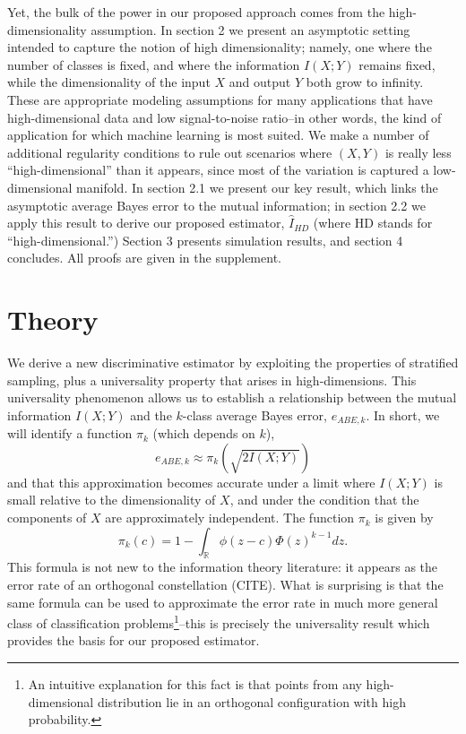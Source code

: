 \documentclass{article}
\begin{document}
Yet, the bulk of the power in our proposed approach comes from the high-dimensionality assumption.
In section 2 we present an asymptotic
setting intended to capture the notion of high dimensionality; namely,
one where the number of classes is fixed, and where the information
$I(X; Y)$ remains fixed, while the dimensionality of the input $X$ and
output $Y$ both grow to infinity.  
These are appropriate modeling assumptions for many applications
that have high-dimensional data and low signal-to-noise ratio--in other words, the kind of application
for which machine learning is most suited.
We make a number of additional
regularity conditions to rule out scenarios where $(X, Y)$ is really
less ``high-dimensional'' than it appears, since most of the variation
is captured a low-dimensional manifold.  In section 2.1 we present our
key result, which links the asymptotic average Bayes error to the
mutual information; in section 2.2 we apply this result to derive our
proposed estimator, $\hat{I}_{HD}$ (where HD stands for ``high-dimensional.'')  Section 3 presents
simulation results, and section 4 concludes.  All proofs are given in the supplement.

\section{Theory}

We derive a new discriminative estimator 
by exploiting the properties of stratified sampling, plus a universality property that arises in high-dimensions.
This universality phenomenon allows us to establish a relationship between the
mutual information $I(X; Y)$ and the $k$-class average Bayes error,
$e_{ABE, k}$.  In short, we will identify a function $\pi_k$
(which depends on $k$),
\begin{equation}\label{abepi}
e_{ABE, k} \approx \pi_k(\sqrt{2 I(X; Y)})
\end{equation}
and that this approximation becomes accurate under a limit where $I(X; Y)$ is small relative to the dimensionality of $X$,
and under the condition that the components of $X$ are approximately independent.
The function $\pi_k$ is given by
\[
\pi_k(c) = 1 - \int_{\mathbb{R}} \phi(z - c)  \Phi(z)^{k-1} dz.
\]
This formula is not new to the information theory literature: it appears as the error rate of an orthogonal constellation (CITE).  What is surprising is that the same formula can be used to approximate the error rate in much more general class of classification problems\footnote{An intuitive explanation for this fact is that points from any high-dimensional distribution lie in an orthogonal configuration with high probability.}--this 
is precisely the universality result which provides the basis for our proposed estimator.
\end{document}
